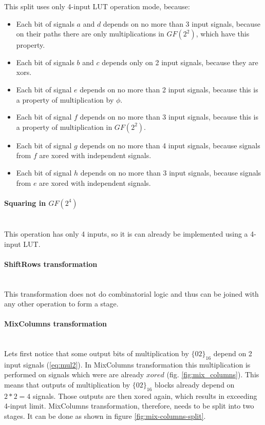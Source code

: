 This split uses only 4-input LUT operation mode, because:
\begin{itemize}[nolistsep]
\item Each bit of signals $a$ and $d$ depends on no more than 3 input signals, because on their paths there are only multiplications in $GF(2^2)$, which have this property. 
\item Each bit of signals $b$ and $c$ depends only on 2 input signals, because they are xors.
\item Each bit of signal $e$ depends on no more than 2 input signals, because this is a property of multiplication by $\phi$.
\item Each bit of signal $f$ depends on no more than 3 input signals, because this is a property of multiplication in $GF(2^2)$.
\item Each bit of signal $g$ depends on no more than 4 input signals, because signals from $f$ are xored with independent signals.
\item Each bit of signal $h$ depends on no more than 3 input signals, because signals from $e$ are xored with independent signals.
\end{itemize}


\paragraph{Squaring in $GF(2^4)$}\mbox{}\\
This operation has only 4 inputs, so it is can already be implemented using a 4-input LUT.


\paragraph{ShiftRows transformation}\mbox{}\\
This transformation does not do combinatorial logic and thus can be joined with any other operation to form a stage.


\paragraph{MixColumns transformation}\mbox{}\\
Lets first notice that some output bits of multiplication by $\{02\}_{16}$ depend on 2 input signals (\ref{eq:mul2}). In MixColumns transformation this multiplication is performed on signals which were are already $xored$ (fig. \ref{fig:mix_columns}). This means that outputs of multiplication by $\{02\}_{16}$ blocks already depend on $2 * 2 = 4$ signals. Those outputs are then xored again, which results in exceeding 4-input limit. MixColumns transformation, therefore, needs to be split into two stages. It can be done as shown in figure \ref{fig:mix-columns-split}.

